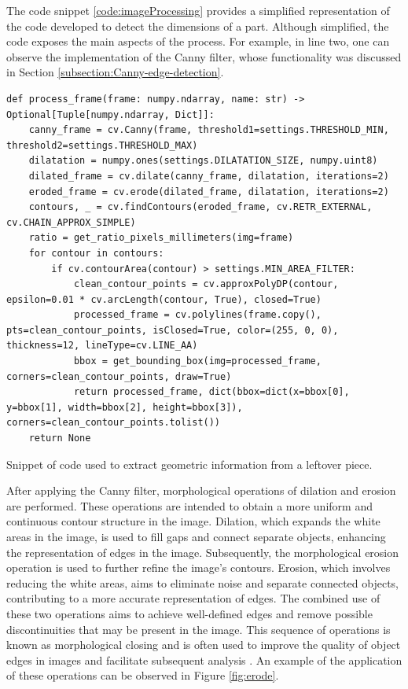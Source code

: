 The code snippet \ref{code:imageProcessing} provides a simplified representation of the code developed to detect the dimensions of a part. Although simplified, the code exposes the main aspects of the process. For example, in line two, one can observe the implementation of the Canny filter, whose functionality was discussed in Section \ref{subsection:Canny-edge-detection}.

\begin{listing}[!ht]
\begin{verbatim}
def process_frame(frame: numpy.ndarray, name: str) -> Optional[Tuple[numpy.ndarray, Dict]]:
    canny_frame = cv.Canny(frame, threshold1=settings.THRESHOLD_MIN, threshold2=settings.THRESHOLD_MAX)
    dilatation = numpy.ones(settings.DILATATION_SIZE, numpy.uint8)
    dilated_frame = cv.dilate(canny_frame, dilatation, iterations=2)
    eroded_frame = cv.erode(dilated_frame, dilatation, iterations=2)
    contours, _ = cv.findContours(eroded_frame, cv.RETR_EXTERNAL, cv.CHAIN_APPROX_SIMPLE)
    ratio = get_ratio_pixels_millimeters(img=frame)
    for contour in contours:
        if cv.contourArea(contour) > settings.MIN_AREA_FILTER:
            clean_contour_points = cv.approxPolyDP(contour, epsilon=0.01 * cv.arcLength(contour, True), closed=True)
            processed_frame = cv.polylines(frame.copy(), pts=clean_contour_points, isClosed=True, color=(255, 0, 0), thickness=12, lineType=cv.LINE_AA)
            bbox = get_bounding_box(img=processed_frame, corners=clean_contour_points, draw=True)
            return processed_frame, dict(bbox=dict(x=bbox[0], y=bbox[1], width=bbox[2], height=bbox[3]), corners=clean_contour_points.tolist())
    return None
\end{verbatim}
\caption{Snippet of code used to extract geometric information from a leftover piece.}
\label{code:imageProcessing}
\end{listing}

After applying the Canny filter, morphological operations of dilation and erosion are performed. These operations are intended to obtain a more uniform and continuous contour structure in the image. Dilation, which expands the white areas in the image, is used to fill gaps and connect separate objects, enhancing the representation of edges in the image. Subsequently, the morphological erosion operation is used to further refine the image's contours. Erosion, which involves reducing the white areas, aims to eliminate noise and separate connected objects, contributing to a more accurate representation of edges. The combined use of these two operations aims to achieve well-defined edges and remove possible discontinuities that may be present in the image. This sequence of operations is known as morphological closing and is often used to improve the quality of object edges in images and facilitate subsequent analysis \cite{Jia5555633}. An example of the application of these operations can be observed in Figure \ref{fig:erode}.

